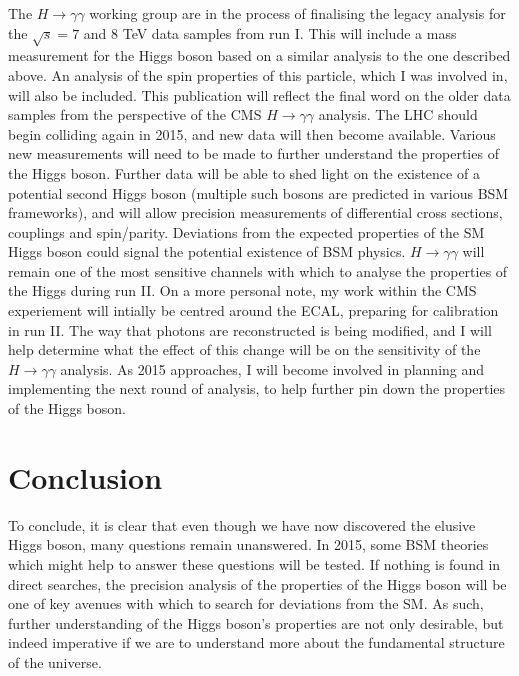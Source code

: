 \documentclass[10pt]{article}
\begin{document}
The $H \rightarrow \gamma \gamma$ working group are in the process of finalising the legacy analysis for the $\sqrt{s}=7$ and $8$ TeV data samples from run I. This will include a mass measurement for the Higgs boson based on a similar analysis to the one described above. An analysis of the spin properties of this particle, which I was involved in, will also be included. This publication will reflect the final word on the older data samples from the perspective of the CMS $H \rightarrow \gamma \gamma$ analysis. The LHC should begin colliding again in 2015, and new data will then become available. Various new measurements will need to be made to further understand the properties of the Higgs boson. Further data will be able to shed light on the existence of a potential second Higgs boson (multiple such bosons are predicted in various BSM frameworks), and will allow precision measurements of differential cross sections, couplings and spin/parity. Deviations from the expected properties of the SM Higgs boson could signal the potential existence of BSM physics.  $H\rightarrow \gamma \gamma$ will remain one of the most sensitive channels with which to analyse the properties of the Higgs during run II.
On a more personal note, my work within the CMS experiement will intially be centred around the ECAL, preparing for calibration in run II. The way that photons are reconstructed is being modified, and I will help determine what the effect of this change will be on the sensitivity of the $H \rightarrow \gamma \gamma$ analysis. As 2015 approaches, I will become involved in planning and implementing the next round of analysis, to help further pin down the properties of the Higgs boson.

\section{Conclusion}

To conclude, it is clear that even though we have now discovered the elusive Higgs boson, many questions remain unanswered. In 2015, some BSM theories which might help to answer these questions will be tested. If nothing is found in direct searches, the precision analysis of the properties of the Higgs boson will be one of key avenues with which to search for deviations from the SM. As such, further understanding of the Higgs boson's properties are not only desirable, but indeed imperative if we are to understand more about the fundamental  structure of the universe.




\end{document}
